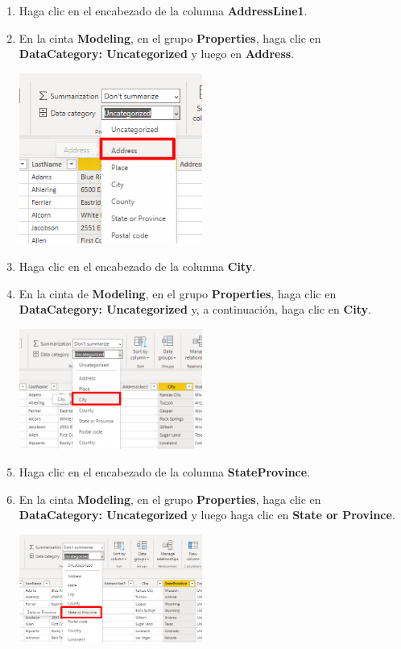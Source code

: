 \documentclass[12pt,letterpaper]{article}
\newcommand\tab[1][1cm]{\hspace*{#1}}
\begin{document}
\begin{enumerate}[\tab 1.]
\begin{center}
        \end{center}
        \item Haga clic en el encabezado de la columna \textbf{AddressLine1}.
        \item En la cinta \textbf{Modeling}, en el grupo \textbf{Properties}, haga clic en \textbf{DataCategory: Uncategorized} y luego en \textbf{Address}.
        \begin{center}
            \includegraphics[width=6cm]{./img/img25.png}
        \end{center}
        \item Haga clic en el encabezado de la columna \textbf{City}.
        \item En la cinta de \textbf{Modeling}, en el grupo \textbf{Properties}, haga clic en \textbf{DataCategory: Uncategorized} y, a continuación, haga clic en \textbf{City}.
        \begin{center}
            \includegraphics[width=6cm]{./img/img27.png}
        \end{center}
        \item Haga clic en el encabezado de la columna \textbf{StateProvince}.
        \item En la cinta \textbf{Modeling}, en el grupo \textbf{Properties}, haga clic en \textbf{DataCategory: Uncategorized} y luego haga clic en \textbf{State or Province}.
        \begin{center}
            \includegraphics[width=6cm]{./img/img29.png}

\end{center}
\end{enumerate}
\end{document}
